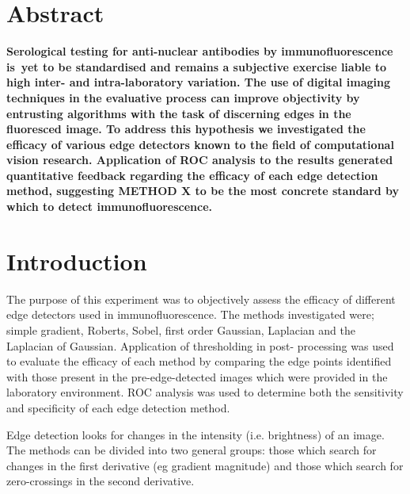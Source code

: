 \documentclass[a4paper]{article}
\begin{document}
\vspace{1em}

\vspace{.5em}

\begin{multicols*}{2}

\section*{\normalsize Abstract}

\textbf{\small Serological testing for anti-nuclear antibodies by immunofluorescence is~yet to be standardised and remains a subjective exercise liable to high inter- and intra-laboratory variation. The use of digital imaging techniques in the evaluative process can improve objectivity by entrusting algorithms with the task of discerning edges in the fluoresced image. To address this hypothesis we investigated the efficacy of various edge detectors known to the field of computational vision research. Application of ROC analysis to the results generated quantitative feedback regarding the efficacy of each edge detection method, suggesting METHOD X to be the most concrete standard by which to detect immunofluorescence.}

\section*{Introduction}

The purpose of this experiment was to objectively assess the efficacy of different edge detectors used in immunofluorescence. The methods investigated were; simple gradient, Roberts, Sobel, first order Gaussian, Laplacian and the Laplacian of Gaussian. Application of thresholding in post- processing was used to evaluate the efficacy of each method by comparing the edge points identified with those present in the pre-edge-detected images which were provided in the laboratory environment. ROC analysis was used to determine both the sensitivity and specificity of each edge detection method. 

Edge detection looks for changes in the intensity (i.e. brightness) of an image. The methods can be divided into two general groups: those which search for changes in the first derivative (eg gradient magnitude) and those which search for zero-crossings in the second derivative. 


\end{multicols*}
\end{document}
